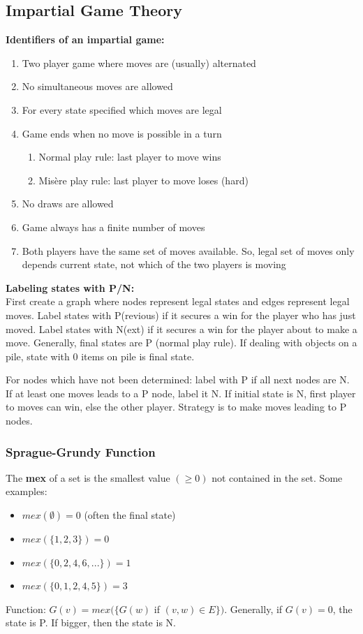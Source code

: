 \documentclass[a4paper,10pt]{article}
\begin{document}
\begin{multicols}{2}
\subsection{Impartial Game Theory}
\textbf{Identifiers of an impartial game:}
\begin{enumerate}[nolistsep,noitemsep,label*=\arabic*.]
\itemsep0em
\item Two player game where moves are (usually) alternated
\item No simultaneous moves are allowed
\item For every state specified which moves are legal
\item Game ends when no move is possible in a turn
\begin{enumerate}[nolistsep,noitemsep,label*=\arabic*.]
\item Normal play rule: last player to move wins
\item Mis\`ere play rule: last player to move loses (hard)
\end{enumerate}
\item No draws are allowed
\item Game always has a finite number of moves
\item Both players have the same set of moves available. So, legal set of moves only depends current state, not which of the two players is moving
\end{enumerate}
\textbf{Labeling states with P/N:}\\
First create a graph where nodes represent legal states and edges represent legal moves. Label states with P(revious) if it secures a win for the player who has just moved. Label states with N(ext) if it secures a win for the player about to make a move. Generally, final states are P (normal play rule). If dealing with objects on a pile, state with 0 items on pile is final state.

For nodes which have not been determined: label with P if all next nodes are N. If at least one moves leads to a P node, label it N. If initial state is N, first player to moves can win, else the other player. Strategy is to make moves leading to P nodes.
\subsubsection{Sprague-Grundy Function}
The \textbf{mex} of a set is the smallest value $(\geq0)$ not contained in the set. Some examples:
\begin{itemize}[nolistsep,noitemsep]
\itemsep0em
\item $mex(\emptyset) = 0$ (often the final state)
\item $mex(\{1, 2, 3\}) = 0$
\item $mex(\{0, 2, 4, 6, ...\}) = 1$
\item $mex(\{0, 1, 2, 4, 5\}) = 3$
\end{itemize}
Function: $G(v) = mex(\{G(w)$ if $(v,w)\in E\})$. Generally, if $G(v)=0$, the state is P. If bigger, then the state is N. 


\end{multicols}
\end{document}
